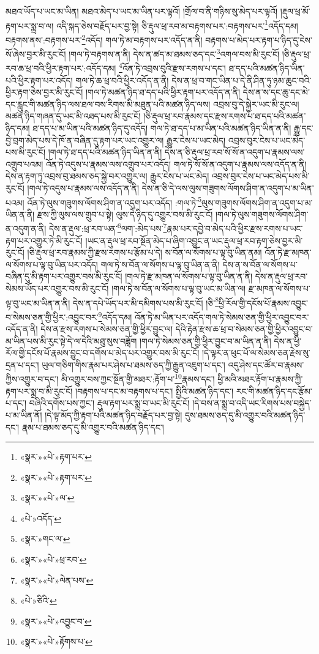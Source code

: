 མཐའ་ཡོད་པ་ཡང་མ་ཡིན། མཐའ་མེད་པ་ཡང་མ་ཡིན་པར་ལྟའོ། །གྲོལ་བ་ནི་གཉིས་སུ་མེད་པར་ལྟའོ། །རྡུལ་ཕྲ་མོ་རྟག་པར་སྨྲ་བ་ལ། འདི་སྐད་ཅེས་བརྗོད་པར་བྱ་སྟེ། ཅི་རྡུལ་ཕྲ་རབ་མ་བརྟགས་པར་:བརྟགས་པར་\footnote{«སྣར་»«པེ་»རྟག་པར་}འདོད་དམ། བརྟགས་ནས་:བརྟགས་པར་\footnote{«སྣར་»«པེ་»རྟག་པར་}འདོད། གལ་ཏེ་མ་བརྟགས་པར་འདོད་ན་ནི། བརྟགས་པ་མེད་པར་རྟག་པ་ཉིད་དུ་ངེས་སོ་ཞེས་བྱར་མི་རུང་ངོ། །གལ་ཏེ་བརྟགས་ན་ནི། དེས་ན་ཚད་མ་ཐམས་ཅད་དང་\footnote{«སྣར་»«པེ་»ལ་}འགལ་བས་མི་རུང་ངོ། །ཅི་རྡུལ་ཕྲ་རབ་ཆ་ཕྲ་བའི་ཕྱིར་རྟག་པར་:འདོད་དམ། \footnote{«པེ་»འདོད་}འོན་ཏེ་འབྲས་བུའི་རྫས་རགས་པ་དང་། ཐ་དད་པའི་མཚན་ཉིད་ཡིན་པའི་ཕྱིར་རྟག་པར་འདོད། གལ་ཏེ་ཆ་ཕྲ་བའི་ཕྱིར་འདོད་ན་ནི། དེས་ན་ཕྲ་བ་གང་ཡིན་པ་དེ་ནི་ཤིན་ཏུ་ཉམ་ཆུང་བའི་ཕྱིར་རྟག་ཅེས་བྱར་མི་རུང་ངོ། །གལ་ཏེ་མཚན་ཉིད་ཐ་དད་པའི་ཕྱིར་རྟག་པར་འདོད་ན་ནི། དེས་ན་ས་དང་ཆུ་དང་མེ་དང་རླུང་གི་མཚན་ཉིད་ལས་ཐལ་བས་རིགས་མི་མཐུན་པའི་མཚན་ཉིད་ལས། འབྲས་བུ་དེ་སྐྱེར་ཡང་མི་རུང་ལ། མཚན་ཉིད་གཞན་དུ་ཡང་མི་འཐད་པས་མི་རུང་ངོ། །ཅི་རྡུལ་ཕྲ་རབ་རྣམས་དང་རྫས་རགས་པ་ཐ་དད་པའི་མཚན་ཉིད་དམ། ཐ་དད་པ་མ་ཡིན་པའི་མཚན་ཉིད་དུ་འདོད། གལ་ཏེ་ཐ་དད་པ་མ་ཡིན་པའི་མཚན་ཉིད་ཡིན་ན་ནི། རྒྱུ་དང་བྱེ་བྲག་མེད་པས་དེ་ཁོ་ན་བཞིན་དུ་རྟག་པར་ཡང་འགྱུར་ལ། རྒྱུར་ངེས་པ་ཡང་མེད། འབྲས་བུར་ངེས་པ་ཡང་མེད་པས་མི་རུང་ངོ། །གལ་ཏེ་ཐ་དད་པའི་མཚན་ཉིད་ཡིན་ན་ནི། དེས་ན་ཅི་རྡུལ་ཕྲ་རབ་སོ་སོ་ན་འདུག་པ་རྣམས་ལས་འགྲུབ་པའམ། འོན་ཏེ་འདུས་པ་རྣམས་ལས་འགྲུབ་པར་འདོད། གལ་ཏེ་སོ་སོ་ན་འདུག་པ་རྣམས་ལས་འདོད་ན་ནི། དེས་ན་རྟག་ཏུ་འབྲས་བུ་ཐམས་ཅད་སྐྱེ་བར་འགྱུར་ལ། རྒྱུར་ངེས་པ་ཡང་མེད། འབྲས་བུར་ངེས་པ་ཡང་མེད་པས་མི་རུང་ངོ། །གལ་ཏེ་འདུས་པ་རྣམས་ལས་འདོད་ན་ནི། དེས་ན་ཅི་དེ་ལས་ལུས་གཟུགས་ལོགས་ཤིག་ན་འདུག་པ་མ་ཡིན་པའམ། འོན་ཏེ་ལུས་གཟུགས་ལོགས་ཤིག་ན་འདུག་པར་འདོད། :གལ་ཏེ་\footnote{«སྣར་»གང་ལ་}ལུས་གཟུགས་ལོགས་ཤིག་ན་འདུག་པ་མ་ཡིན་ན་ནི། རྫས་ཀྱི་ལུས་ལས་གྲུབ་པ་སྟེ། ལུས་དེ་ཉིད་དུ་འགྱུར་བས་མི་རུང་ངོ། །གལ་ཏེ་ལུས་གཟུགས་ལོགས་ཤིག་ན་འདུག་ན་ནི། དེས་ན་རྡུལ་:ཕྲ་རབ་ཡན་\footnote{«སྣར་»«པེ་»ཕྲ་རབ་}ལག་:མེད་པས་\footnote{«སྣར་»«པེ་»ལེན་པས་}རྣམ་པར་དབྱེ་བ་མེད་པའི་ཕྱིར་རྫས་རགས་པ་ཡང་རྟག་པར་འགྱུར་ཏེ་མི་རུང་ངོ། །ཡང་ན་རྡུལ་ཕྲ་རབ་སྔོན་མེད་པ་ཞིག་འབྱུང་ན་ཡང་རྡུལ་ཕྲ་རབ་རྟག་ཅེས་བྱར་མི་རུང་ངོ། །ཅི་རྡུལ་ཕྲ་རབ་རྣམས་ཀྱི་རྫས་རགས་པ་རྩོམ་པ་དེ། ས་བོན་ལ་སོགས་པ་ལྟ་བུ་ཡིན་ནམ། འོན་ཏེ་རྫ་མཁན་ལ་སོགས་པ་ལྟ་བུ་ཡིན་པར་འདོད། གལ་ཏེ་ས་བོན་ལ་སོགས་པ་ལྟ་བུ་ཡིན་ན་ནི། དེས་ན་ས་བོན་ལ་སོགས་པ་བཞིན་དུ་མི་རྟག་པར་འགྱུར་བས་མི་རུང་ངོ། །གལ་ཏེ་རྫ་མཁན་ལ་སོགས་པ་ལྟ་བུ་ཡིན་ན་ནི། དེས་ན་རྡུལ་ཕྲ་རབ་སེམས་ཡོད་པར་འགྱུར་བས་མི་རུང་ངོ། །གལ་ཏེ་ས་བོན་ལ་སོགས་པ་ལྟ་བུ་ཡང་མ་ཡིན་ལ། རྫ་མཁན་ལ་སོགས་པ་ལྟ་བུ་ཡང་མ་ཡིན་ན་ནི། དེས་ན་དཔེ་ཡོད་པར་མི་དམིགས་པས་མི་རུང་ངོ། །ཅི་\footnote{«པེ་»ཅིའི་}ཕྱི་རོལ་གྱི་དངོས་པོ་རྣམས་འབྱུང་བ་སེམས་ཅན་གྱི་ཕྱིར་:འབྱུང་བར་\footnote{«སྣར་»«པེ་»འབྱུང་བ་}འདོད་དམ། འོན་ཏེ་མ་ཡིན་པར་འདོད་གལ་ཏེ་སེམས་ཅན་གྱི་ཕྱིར་འབྱུང་བར་འདོད་ན་ནི། དེས་ན་རྫས་རགས་པ་སེམས་ཅན་གྱི་ཕྱིར་བྱུང་ལ། དེའི་རྟེན་རྫས་ཆ་ཕྲ་བ་སེམས་ཅན་གྱི་ཕྱིར་འབྱུང་བ་མ་ཡིན་པས་མི་རུང་སྟེ་དེ་ལ་དེའི་མཐུ་སུས་བཟློག །གལ་ཏེ་སེམས་ཅན་གྱི་ཕྱིར་བྱུང་བ་མ་ཡིན་ན་ནི། དེས་ན་ཕྱི་རོལ་གྱི་དངོས་པོ་རྣམས་བྱུང་བ་དགོས་པ་མེད་པར་འགྱུར་བས་མི་རུང་ངོ། །དེ་ལྟར་ན་ཕུང་པོ་ལ་སེམས་ཅན་རྗེས་སུ་དྲན་པ་དང་། ཡུལ་གཅིག་གིས་རྣམ་པར་ཤེས་པ་ཐམས་ཅད་ཀྱི་རྒྱུན་འཇུག་པ་དང་། འདུ་ཤེས་དང་ཚོར་བ་རྣམས་ཀྱིས་འགྱུར་བ་དང་། མི་འགྱུར་བས་ཀྱང་སྔོན་གྱི་མཐར་:རྟོག་པ་\footnote{«སྣར་»«པེ་»རྟོགས་པ་}རྣམས་དང་། ཕྱི་མའི་མཐར་རྟོག་པ་རྣམས་ཀྱི་རྟག་པར་སྨྲ་བ་མི་རུང་ངོ། །བརྟགས་པ་དང་མ་བརྟགས་པ་དང་། སྤྱིའི་མཚན་ཉིད་དང་། རང་གི་མཚན་ཉིད་དང་རྩོམ་པ་དང་། བཞིའི་དགོས་པས་ཀྱང་། རྡུལ་རྟག་པར་སྨྲ་བ་ཡང་མི་རུང་ངོ། །དེ་བས་ན་སྨྲ་བ་འདི་ཡང་རིགས་པས་བསྐྱེད་པ་མ་ཡིན་ནོ། །དེ་ལྟ་མོད་ཀྱི་རྟག་པའི་མཚན་ཉིད་བརྗོད་པར་བྱ་སྟེ། དུས་ཐམས་ཅད་དུ་མི་འགྱུར་བའི་མཚན་ཉིད་དང་། རྣམ་པ་ཐམས་ཅད་དུ་མི་འགྱུར་བའི་མཚན་ཉིད་དང་། 